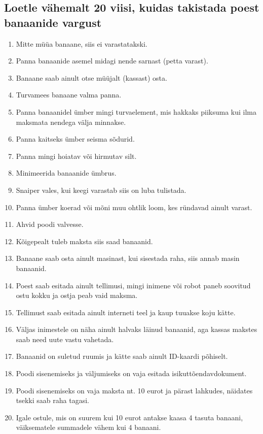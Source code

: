 \documentclass{article}
\begin{document}
\begin{enumerate}
\section{Loetle vähemalt 20 viisi, kuidas takistada poest banaanide vargust}
\begin{enumerate}
	\item{Mitte müüa banaane, siis ei varastatakski.}
	\item{Panna banaanide asemel midagi nende sarnast (petta varast).}
	\item{Banaane saab ainult otse müüjalt (kassast) osta.}
	\item{Turvamees banaane valma panna.}
	\item{Panna banaanidel ümber mingi turvaelement, mis hakkaks piiksuma kui ilma maksmata nendega välja minnakse.}
	\item{Panna kaitseks ümber seisma sõdurid.}
	\item{Panna mingi hoiatav või hirmutav silt.}
	\item{Minimeerida banaanide ümbrus.}
	\item{Snaiper vales, kui keegi varastab siis on luba tulistada.}
	\item{Panna ümber koerad või mõni muu ohtlik loom, kes ründavad ainult varast.}
	\item{Ahvid poodi valvesse.}
	\item{Kõigepealt tuleb maksta siis saad banaanid.}
	\item{Banaane saab osta ainult masinast, kui sisestada raha, siis annab masin banaanid.}
	\item{Poest saab esitada ainult tellimusi, mingi inimene või robot paneb soovitud ostu kokku ja ostja peab vaid maksma.}
	\item{Tellimust saab esitada ainult interneti teel ja kaup tuuakse koju kätte.}
	\item{Väljas inimestele on näha ainult halvaks läinud banaanid, aga kassas makstes saab need uute vastu vahetada.}
	\item{Banaanid on suletud ruumis ja kätte saab ainult ID-kaardi põhiselt.}
	\item{Poodi sisenemiseks ja väljumiseks on vaja esitada isikuttõendavdokument.}
	\item{Poodi sisenemiseks on vaja maksta nt. 10 eurot ja pärast lahkudes, näidates tsekki saab raha tagasi.}
	\item{Igale ostule, mis on suurem kui 10 eurot antakse kaasa 4 tasuta banaani, väiksematele summadele vähem kui 4 banaani.}
\end{enumerate}


\end{enumerate}
\end{document}
